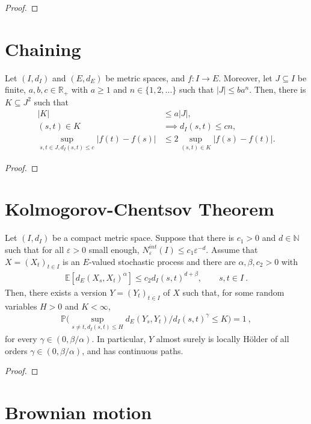 \begin{proof}

\end{proof}


\section{Chaining}


\begin{lemma}\label{lem:chain}
  \notready
  Let $(I,d_I)$ and $(E,d_E)$ be metric spaces, and $f : I \to E$.
  Moreover, let $J \subseteq I$ be finite, $a,b,c \in \mathbb R_+$ with $a \ge 1$ and $n \in \{1, 2, ...\}$ such that $|J| \le b a^n$.
  Then, there is $K \subseteq J^2$ such that
  \begin{align}
    |K|
    & \le a |J|, \label{eq:chain1}
    \\
    (s,t) \in K
    & \implies d_I(s,t) \le cn, \label{eq:chain2}
    \\
    \sup_{s,t\in J, d_I(s,t) \le c} |f(t) - f(s)|
    & \le 2 \sup_{(s,t) \in K} |f(s) - f(t)|.
    \label{eq:chain3}
  \end{align}
\end{lemma}

\begin{proof}

\end{proof}


\section{Kolmogorov-Chentsov Theorem}


\begin{theorem} \label{thm:kolchen_general}
  \notready
Let $(I, d_I)$ be a compact metric space.
Suppose that there is $c_1>0$ and $d \in \mathbb{N}$ such that for all $\varepsilon > 0$ small enough, $N^{int}_\varepsilon(I) \le c_1 \varepsilon^{-d}$.
Assume that $X = (X_t)_{t\in I}$ is an $E$-valued stochastic process and there are $\alpha, \beta, c_2>0$ with
\begin{align*}
  \mathbb{E}[d_E(X_s, X_t)^\alpha]
  \le c_2 d_I(s,t)^{d+\beta}, \qquad s,t\in I
  \: .
\end{align*}
Then, there exists a version $Y = (Y_t)_{t\in I}$ of $X$ such that, for some random variables $H>0$ and $K<\infty$,
\begin{align*}
  \mathbb{P}\Big(\sup_{s\neq t, d_I(s,t) \leq H} d_E(Y_s, Y_t)/d_I(s,t)^\gamma
  \le K\Big) = 1
  \: ,
\end{align*}
for every $\gamma\in(0,\beta/\alpha)$.
In particular, $Y$ almost surely is locally Hölder of all orders $\gamma \in (0,\beta/\alpha)$, and has continuous paths.
\end{theorem}

\begin{proof}

\end{proof}

\section{Brownian motion}
